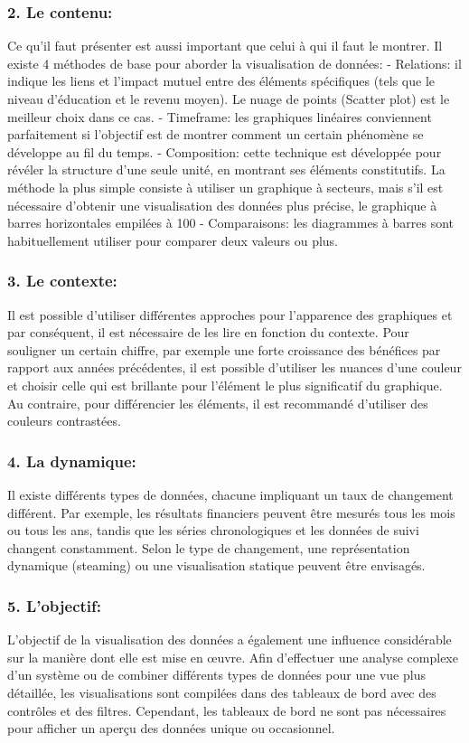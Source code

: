 \documentclass[french, a4paper, 12pt]{report}
\begin{document}
\subsubsection{2. Le contenu:}
Ce qu’il faut présenter est aussi important que celui à qui il faut le montrer. Il existe 4 méthodes de base pour aborder la visualisation de données:
- Relations: il indique les liens et l'impact mutuel entre des éléments spécifiques (tels que le niveau d'éducation et le revenu moyen). Le nuage de points (Scatter plot) est le meilleur choix dans ce cas.
- Timeframe: les graphiques linéaires conviennent parfaitement si l’objectif est de montrer comment un certain phénomène se développe au fil du temps.
- Composition: cette technique est développée pour révéler la structure d'une seule unité, en montrant ses éléments constitutifs. La méthode la plus simple consiste à utiliser un graphique à secteurs, mais s’il est nécessaire d’obtenir une visualisation des données plus précise, le graphique à barres horizontales empilées à 100%
- Comparaisons: les diagrammes à barres sont habituellement utiliser pour  comparer deux valeurs ou plus.
\subsubsection{3. Le contexte: }
Il est possible d’utiliser différentes approches pour l'apparence des graphiques et par conséquent, il est nécessaire de les lire en fonction du contexte. Pour souligner un certain chiffre, par exemple une forte croissance des bénéfices par rapport aux années précédentes, il est possible d’utiliser les nuances d’une couleur et choisir celle qui est brillante pour l’élément le plus significatif du graphique. Au contraire, pour différencier les éléments, il est recommandé d’utiliser des couleurs contrastées.
\subsubsection{4. La dynamique:  }
Il existe différents types de données, chacune impliquant un taux de changement différent. Par exemple, les résultats financiers peuvent être mesurés tous les mois ou tous les ans, tandis que les séries chronologiques et les données de suivi changent constamment. Selon le type de changement, une représentation dynamique (steaming) ou une visualisation statique peuvent être envisagés.
\subsubsection{5. L’objectif:  }
L’objectif de la visualisation des données a également une influence considérable sur la manière dont elle est mise en œuvre. Afin d'effectuer une analyse complexe d'un système ou de combiner différents types de données pour une vue plus détaillée, les visualisations sont compilées dans des tableaux de bord avec des contrôles et des filtres. Cependant, les tableaux de bord ne sont pas nécessaires pour afficher un aperçu des données unique ou occasionnel.
\end{document}
